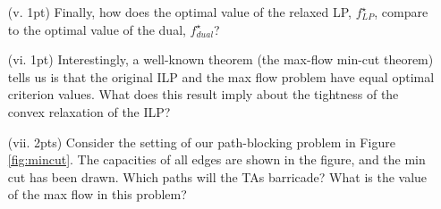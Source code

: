 \documentclass{article}
\theoremstyle{remark}
\theoremstyle{definition}
\begin{document}
\begin{enumerate}[(a, 3pts)]
\begin{enumerate}
	\item[ (v. 1pt)]  Finally, how does the optimal value of the relaxed LP, $f^{\star}_{LP}$, compare to the optimal value of the dual, $f^{\star}_{dual}$? 
	\item[(vi. 1pt)] Interestingly, a well-known theorem (the max-flow min-cut theorem) tells us is that the original ILP and the max flow problem have equal optimal criterion values. What does this result imply about the tightness of the convex relaxation of the ILP?
	\item[(vii. 2pts)] Consider the setting of our path-blocking problem in Figure \ref{fig:mincut}. The capacities of all edges are shown in the figure, and the min cut has been drawn. Which paths will the TAs barricade? What is the value of the max flow in this problem?
	\end{enumerate}
\end{enumerate}
\end{document}
